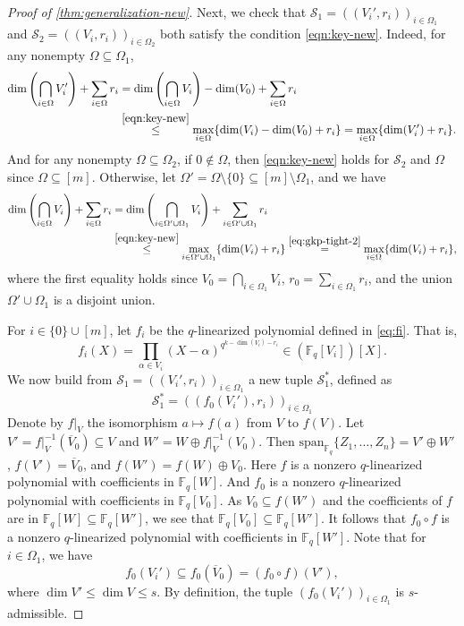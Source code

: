 \documentclass[11pt]{article}
\theoremstyle{plain}
\theoremstyle{definition}
\theoremstyle{remark}
\newcommand{\F}{\mathbb{F}}
\newcommand{\cS}{\mathcal{S}}
\begin{document}
\begin{proof}[Proof of \cref{thm:generalization-new}]
Next, we check that $\cS_1=((V_i', r_i))_{i\in \Omega_1}$ and $\cS_2=((V_i, r_i))_{i\in \Omega_2}$ both satisfy the condition \eqref{eqn:key-new}. Indeed, for any nonempty $\Omega\subseteq \Omega_1$, 
\begin{align*}
\dim\left(\bigcap_{i\in \Omega}V'_i\right)+\sum_{i\in \Omega}r_i
&=\dim\left(\bigcap_{i\in \Omega}V_i\right)-\dim(V_0)+\sum_{i\in \Omega}r_i\\
&\stackrel{\eqref{eqn:key-new}}{\leq} \max_{i\in \Omega} \{\dim(V_i)-\dim(V_0)+r_i\}=\max_{i\in \Omega} \{\dim(V'_i)+r_i\}.
\end{align*}
And for any nonempty $\Omega\subseteq\Omega_2$, if $0\notin \Omega$, then \eqref{eqn:key-new} holds for $\cS_2$ and $\Omega$ since $\Omega\subseteq [m]$. Otherwise, let $\Omega'=\Omega\setminus \{0\}\subseteq [m]\setminus\Omega_1$, and we have
\begin{align*}
\dim\left(\bigcap_{i\in \Omega}V_i\right)+\sum_{i\in \Omega}r_i&=\dim\left(\bigcap_{i\in \Omega'\cup \Omega_1}V_i\right)+\sum_{i\in \Omega'\cup \Omega_1}r_i\\
&\stackrel{\eqref{eqn:key-new}}{\leq} \max_{i\in \Omega'\cup \Omega_1} \{\dim(V_i)+r_i\}\stackrel{\eqref{eq:gkp-tight-2}}{=}\max_{i\in \Omega} \{\dim(V_i)+r_i\},
\end{align*}
where the first equality holds since $V_0=\bigcap_{i\in \Omega_1}V_i$, $r_0=\sum_{i\in \Omega_1}r_i$, and the union $\Omega'\cup\Omega_1$ is a disjoint union. 

For $i\in \{0\}\cup [m]$, let $f_i$ be the $q$-linearized polynomial defined in \eqref{eq:fi}. That is,
\[
f_i(X)=\prod_{\alpha\in V_i}(X-\alpha)^{q^{k-\dim(V_i)-r_i}}\in (\F_q[V_i])[X].
\]
We now build from $\cS_1=((V_i', r_i))_{i\in \Omega_1}$ a new tuple $\cS_1^*$, defined as
\[
\cS_1^*=((f_0(V_i'), r_i))_{i\in \Omega_1}
\]
Denote by $f|_V$ the isomorphism $a\mapsto f(a)$ from $V$ to $f(V)$. Let $V'=f|_V^{-1}(\overline{V}_0)\subseteq V$ and $W'=W\oplus f|_V^{-1}(V_0)$. Then $\mathrm{span}_{\F_q}\{Z_1,\dots,Z_n\}=V'\oplus W'$, $f(V')=\overline{V}_0$, and $f(W')=f(W)\oplus V_0$.
Here $f$ is a nonzero $q$-linearized polynomial with coefficients in $\F_q[W]$.
And $f_0$ is a nonzero $q$-linearized polynomial with coefficients in $\F_q[V_0]$.
As $V_0\subseteq f(W')$ and the coefficients of $f$ are in $\F_q[W]\subseteq\F_q[W']$, we see that $\F_q[V_0]\subseteq\F_q[W']$.
It follows that $f_0\circ f$ is a nonzero $q$-linearized polynomial with coefficients in $\F_q[W']$.
Note that for $i\in \Omega_1$, we have 
\[
f_0(V_i')\subseteq f_0(\overline{V}_0)=(f_0\circ f)(V'),
\]
where $\dim V'\leq \dim V\leq s$.
By definition, the tuple $(f_0(V_i'))_{i\in\Omega_1}$ is $s$-admissible.


\end{proof}
\end{document}
